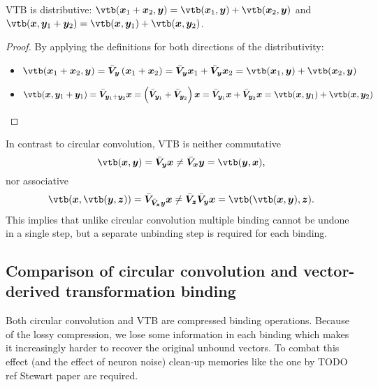 \begin{corollary}
    VTB is distributive: $\vtb(\vc x_1 + \vc x_2, \vc y) = \vtb(\vc x_1, \vc y) + \vtb(\vc x_2, \vc y)$ and $\vtb(\vc x, \vc y_1 + \vc y_2) = \vtb(\vc x, \vc y_1) + \vtb(\vc x, \vc y_2)$.
    \begin{proof}
        By applying the definitions for both directions of the distributivity:
        \begin{itemize}
            \item $\vtb(\vc x_1 + \vc x_2, \vc y) = \bar{\mat V}_{\vc y} \del{\vc x_1 + \vc x_2} = \bar{\mat V}_{\vc y} \vc x_1 + \bar{\mat V}_{\vc y} \vc x_2 = \vtb(\vc x_1, \vc y) + \vtb(\vc x_2, \vc y)$
            \item $\vtb(\vc x, \vc y_1 + \vc y_1) = \bar{\mat V}_{\vc y_1 + \vc y_2} \vc x = \del{\bar{\mat V}_{\vc y_1} + \bar{\mat V}_{\vc y_2}} \vc x = \bar{\mat V}_{\vc y_1} \vc x + \bar{\mat V}_{\vc y_2} \vc x = \vtb(\vc x, \vc y_1) + \vtb(\vc x, \vc y_2)$
    \end{itemize}
    \end{proof}
\end{corollary}
In contrast to circular convolution, VTB is neither commutative
\begin{equation}
    \vtb(\vc x, \vc y) = \bar{\mat V}_{\vc y} \vc x \neq \bar{\mat V}_{\vc x} \vc y = \vtb(\vc y, \vc x) \text{,}
\end{equation}
nor associative
\begin{equation}
    \vtb(\vc x, \vtb(\vc y, \vc z)) = \bar{\mat V}_{\bar{\mat V}_{\vc z} \vc y} \vc x \neq \bar{\mat V}_{\vc z} \bar{\mat V}_{\vc y} \vc x = \vtb(\vtb(\vc x, \vc y), \vc z) \text{.}
\end{equation}
This implies that unlike circular convolution multiple binding cannot be undone in a single step, but a separate unbinding step is required for each binding.

\subsection{Comparison of circular convolution and vector-derived transformation binding}
Both circular convolution and VTB are compressed binding operations.
Because of the lossy compression, we lose some information in each binding which makes it increasingly harder to recover the original unbound vectors.
To combat this effect (and the effect of neuron noise) clean-up memories like the one by TODO ref Stewart paper are required.

